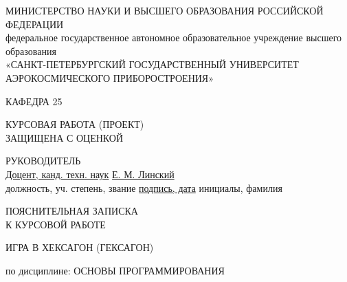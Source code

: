 \documentclass[a4paper]{article}
\begin{document}
\begin{center}
    {МИНИСТЕРСТВО НАУКИ И ВЫСШЕГО ОБРАЗОВАНИЯ РОССИЙСКОЙ ФЕДЕРАЦИИ} \\
    федеральное государственное автономное образовательное учреждение высшего образования \\
    {«САНКТ-ПЕТЕРБУРГСКИЙ ГОСУДАРСТВЕННЫЙ УНИВЕРСИТЕТ АЭРОКОСМИЧЕСКОГО ПРИБОРОСТРОЕНИЯ»} \\
\end{center}

\vspace{0.5cm}

\begin{center}
    {КАФЕДРА 25} \\
\end{center}

\vspace{1cm}

\begin{flushleft}
    КУРСОВАЯ РАБОТА (ПРОЕКТ) \\
    ЗАЩИЩЕНА С ОЦЕНКОЙ \\
\end{flushleft}

\begin{flushleft}
    РУКОВОДИТЕЛЬ \\
    \underline{Доцент, канд. техн. наук} 
    \qquad \qquad \qquad \qquad \qquad \qquad \qquad \qquad \qquad \qquad \qquad \qquad \qquad \qquad \underline{Е. М. Линский}\\
    должность, уч. степень, звание 
    \qquad \qquad \qquad \qquad\underline{подпись, дата}
    \qquad \qquad \qquad \qquad \qquad инициалы, фамилия
\end{flushleft}

\vspace{1cm}

\begin{center}
    ПОЯСНИТЕЛЬНАЯ ЗАПИСКА\\
    К КУРСОВОЙ РАБОТЕ \\
\end{center}

\vspace{1cm}

\begin{center}
    ИГРА В ХЕКСАГОН (ГЕКСАГОН) \\
\end{center}

\vspace{1cm}

\begin{center}
    по дисциплине:
    ОСНОВЫ ПРОГРАММИРОВАНИЯ
\end{center}
\end{document}
